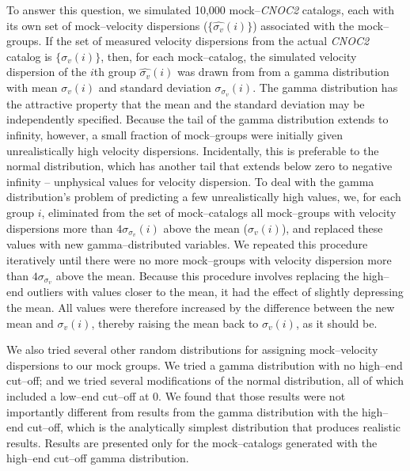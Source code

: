 To answer this question, we simulated 10,000 mock--\textsl{CNOC2}
catalogs, each with its own set of mock--velocity dispersions
($\{\widehat{\sigma_v}(i)\}$) associated with the mock--groups.  If
the set of measured velocity dispersions from the actual
\textsl{CNOC2} catalog is $\{\sigma_v(i)\}$, then, for each
mock--catalog, the simulated velocity dispersion of the $i$th group
$\widehat{\sigma_v}(i)$ was drawn from from a gamma distribution with
mean $\sigma_v(i)$ and standard deviation $\sigma_{\sigma_v}(i)$.  The
gamma distribution has the attractive property that the mean and the
standard deviation may be independently specified.  Because the tail
of the gamma distribution extends to infinity, however, a small
fraction of mock--groups were initially given unrealistically high
velocity dispersions. Incidentally, this is preferable to the normal
distribution, which has another tail that extends below zero to
negative infinity -- unphysical values for velocity dispersion.  To
deal with the gamma distribution's problem of predicting a few
unrealistically high values, we, for each group $i$, eliminated from
the set of mock--catalogs all mock--groups with velocity dispersions
more than $4\sigma_{\sigma_v}(i)$ above the mean ($\sigma_v(i)$), and
replaced these values with new gamma--distributed variables.  We
repeated this procedure iteratively until there were no more
mock--groups with velocity dispersion more than $4\sigma_{\sigma_v}$
above the mean.  Because this procedure involves replacing the
high--end outliers with values closer to the mean, it had the effect
of slightly depressing the mean.  All values were therefore increased
by the difference between the new mean and $\sigma_v(i)$, thereby
raising the mean back to $\sigma_v(i)$, as it should be.

We also tried several other random distributions for assigning
mock--velocity dispersions to our mock groups.  We tried a gamma
distribution with no high--end cut--off; and we tried several
modifications of the normal distribution, all of which included a
low--end cut--off at $0$.  We found that those results were not
importantly different from results from the gamma distribution with
the high--end cut--off, which is the analytically simplest
distribution that produces realistic results.  Results are presented
only for the mock--catalogs generated with the high--end cut--off
gamma distribution.

